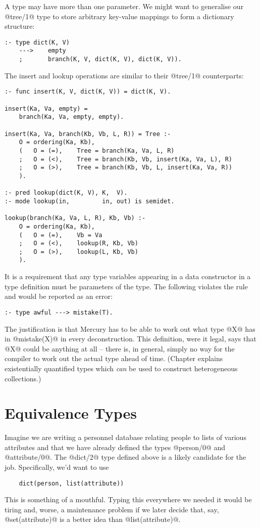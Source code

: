A type may have more than one parameter.  We might want to
generalise our @tree/1@ type to store arbitrary key-value mappings to form a
dictionary structure:
\begin{verbatim}
:- type dict(K, V)
    --->    empty
    ;       branch(K, V, dict(K, V), dict(K, V)).
\end{verbatim}
The insert and lookup operations are similar to their @tree/1@ counterparts:
\begin{verbatim}
:- func insert(K, V, dict(K, V)) = dict(K, V).

insert(Ka, Va, empty) =
    branch(Ka, Va, empty, empty).

insert(Ka, Va, branch(Kb, Vb, L, R)) = Tree :-
    O = ordering(Ka, Kb),
    (   O = (=),    Tree = branch(Ka, Va, L, R)
    ;   O = (<),    Tree = branch(Kb, Vb, insert(Ka, Va, L), R)
    ;   O = (>),    Tree = branch(Kb, Vb, L, insert(Ka, Va, R))
    ).

:- pred lookup(dict(K, V), K,  V).
:- mode lookup(in,         in, out) is semidet.

lookup(branch(Ka, Va, L, R), Kb, Vb) :-
    O = ordering(Ka, Kb),
    (   O = (=),    Vb = Va
    ;   O = (<),    lookup(R, Kb, Vb)
    ;   O = (>),    lookup(L, Kb, Vb)
    ).
\end{verbatim}
It is a requirement that any type variables appearing in a data constructor
in a type definition must be parameters of the type.  The following
violates the rule and would be reported as an error:
\begin{verbatim}
:- type awful ---> mistake(T).
\end{verbatim}
The justification is that Mercury has to be able to work out what type @X@
has in @mistake(X)@ in every deconstruction.
This definition,
were it legal, says that @X@ could be anything at all
-- there is, in general, simply no way for the compiler to work out the
actual type ahead of time.
(Chapter \XXX{} explains existentially quantified types which \emph{can} be
used to construct heterogeneous collections.)


\section{Equivalence Types}

Imagine we are writing a personnel database relating people to lists of
various attributes and that we have already defined the types @person/0@ and
@attribute/0@.
The @dict/2@ type defined above is a likely candidate for the job.
Specifically, we'd want to use
\begin{verbatim}
    dict(person, list(attribute))
\end{verbatim}
This is something of a mouthful.  Typing this everywhere we needed it would be
tiring and, worse, a maintenance problem if we later decide that, say,
@set(attribute)@ is a better idea than @list(attribute)@.

